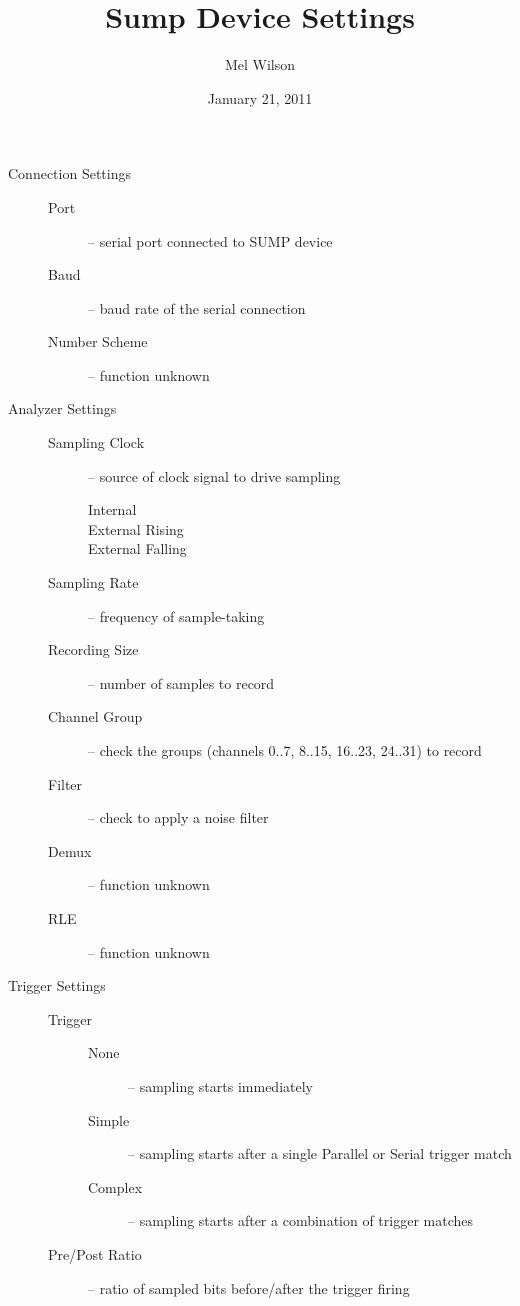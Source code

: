 \documentclass{article}
\begin{document}
\title{Sump Device Settings}
\author{Mel Wilson}
\date{January 21, 2011}
\maketitle
\begin{description} %
\item [Connection Settings] \hfill
\begin{description}
\item [Port] -- serial port connected to SUMP device
\item [Baud] -- baud rate of the serial connection
\item [Number Scheme] -- function unknown
\end{description}

\item[Analyzer Settings] \hfill
\begin{description}
\item [Sampling Clock] -- source of clock signal to drive sampling
\begin{description} %
  \item[Internal]
  \item[External Rising]
  \item[External Falling]
\end{description}
\item [Sampling Rate] -- frequency of sample-taking
\item [Recording Size] -- number of samples to record
\item [Channel Group] -- check the groups (channels 0..7, 8..15, 16..23, 24..31) to record
\item [Filter] -- check to apply a noise filter
\item [Demux] -- function unknown
\item [RLE] -- function unknown
\end{description}

\item[Trigger Settings] \hfill
\begin{description} %
\item [Trigger] \hfill
  \begin{description}
   \item [None] -- sampling starts immediately
   \item [Simple] -- sampling starts after a single Parallel or Serial trigger match
   \item [Complex] --  sampling starts after a combination of trigger matches
   \end{description}
\item [Pre/Post Ratio] -- ratio of sampled bits before/after the trigger firing


\end{description}
\end{description}
\end{document}
